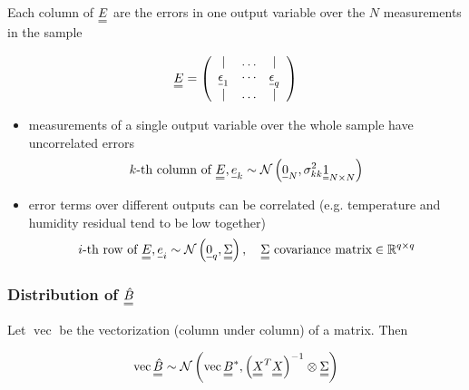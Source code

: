 Each column of $\mat{E}$ are the errors in one output variable over the $N$
measurements in the sample

\begin{equation}
    \mat{E}=\left(\begin{array}{ccc}
    \mid & \ldots & \mid \\
    \vec{\epsilon}_1 & \cdots & \vec{\epsilon}_q \\
    \mid & \ldots & \mid
    \end{array}\right)
\end{equation}

\begin{itemize}
    \item measurements of a single output variable over the whole sample have uncorrelated errors
    \begin{equation}
        k \text{-th column of } \mat{E}, \vec{e}_k \sim \mathcal{N}\left(\vec{0}_N, \sigma_{kk}^2 \mat{1}_{N \times N}\right)
    \end{equation}
    \item error terms over different outputs can be correlated (e.g. temperature and humidity residual tend to be low together)
    \begin{equation}
        i\text{-th row of } \mat{E}, \vec{e}_i \sim \mathcal{N}\left(\vec{0}_q, \mat{\Sigma}\right), \quad \mat{\Sigma} \text{ covariance matrix} \in \mathbb{R}^{q \times q}
    \end{equation}
\end{itemize}

\subsubsection{Distribution of $\mat{\hat{B}}$}
Let $\operatorname{vec}$ be the vectorization (column under column) of
a matrix. Then

\begin{equation}
    \operatorname{vec} \mat{\hat{B}} \sim \mathcal{N}\left(\operatorname{vec} \mat{B}^*, \left( \mat{X}^T \mat{X} \right)^{-1} \otimes \mat{\Sigma} \right)
\end{equation}

